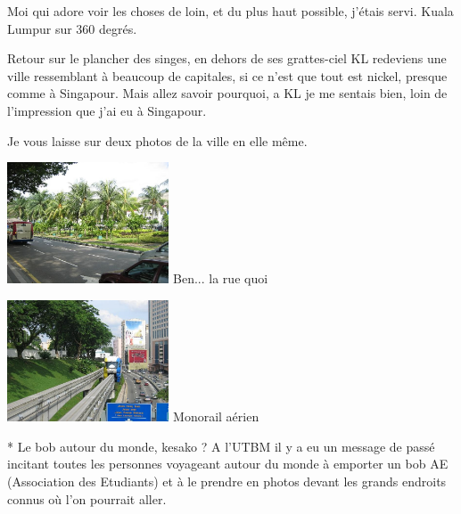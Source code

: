 \begin{multicols}{2}
Moi qui adore voir les choses de loin, et du plus haut possible, j'étais servi. Kuala Lumpur sur 360 degrés.

Retour sur le plancher des singes, en dehors de ses grattes-ciel KL redeviens une ville ressemblant à beaucoup de capitales, si ce n'est que tout est nickel, presque comme à Singapour. Mais allez savoir pourquoi, a KL je me sentais bien, loin de l'impression que j'ai eu à Singapour.

Je vous laisse sur deux photos de la ville en elle même.

\hspace*{-0.65cm}
\includegraphics[width=4.8cm]{articles/Kuala-lumpur/1211016874hbIL.jpg}
Ben... la rue quoi

\hspace*{-0.65cm}
\includegraphics[width=4.8cm]{articles/Kuala-lumpur/1211017229ryCi.jpg}
Monorail aérien

\end{multicols}

 * Le bob autour du monde, kesako ? A l'UTBM il y a eu un message de passé incitant toutes les personnes voyageant autour du monde à emporter un bob AE (Association des Etudiants) et à le prendre en photos devant les grands endroits connus où l'on pourrait aller.
